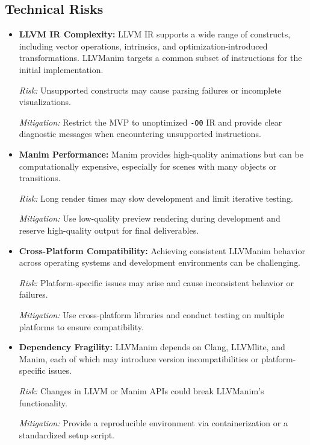 \subsection{Technical Risks}
\begin{itemize}
  \item \textbf{LLVM IR Complexity:} LLVM IR supports a wide range of constructs, including vector operations, intrinsics, and optimization-introduced transformations. LLVManim targets a common subset of instructions for the initial implementation.\par
  {\raggedright\textit{Risk:} Unsupported constructs may cause parsing failures or incomplete visualizations.\par}
  {\raggedright\textit{Mitigation:} Restrict the MVP to unoptimized \texttt{-O0} IR and provide clear diagnostic messages when encountering unsupported instructions.\par}

  \item \textbf{Manim Performance:} Manim provides high-quality animations but can be computationally expensive, especially for scenes with many objects or transitions.\par
  {\raggedright\textit{Risk:} Long render times may slow development and limit iterative testing.\par}
  {\raggedright\textit{Mitigation:} Use low-quality preview rendering during development and reserve high-quality output for final deliverables.\par}

  \item \textbf{Cross-Platform Compatibility:} Achieving consistent LLVManim behavior across operating systems and development environments can be challenging.\par
  {\raggedright\textit{Risk:} Platform-specific issues may arise and cause inconsistent behavior or failures.\par}
  {\raggedright\textit{Mitigation:} Use cross-platform libraries and conduct testing on multiple platforms to ensure compatibility.\par}

  \item \textbf{Dependency Fragility:} LLVManim depends on Clang, LLVMlite, and Manim, each of which may introduce version incompatibilities or platform-specific issues.\par
  {\raggedright\textit{Risk:} Changes in LLVM or Manim APIs could break LLVManim's functionality.\par}
  {\raggedright\textit{Mitigation:} Provide a reproducible environment via containerization or a standardized setup script.\par}
\end{itemize}


